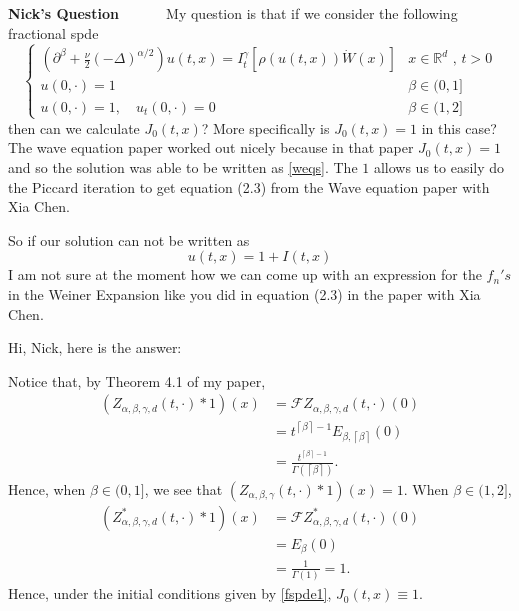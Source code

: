 \documentclass[a4paper,11pt]{article}
\numberwithin{equation}{section}
\theoremstyle{plain}
\theoremstyle{definition}
\newcommand{\Ceil}[1]{\left\lceil #1 \right\rceil}
\newcommand{\calF}{\mathcal{F}}
\newcommand{\R}{\mathbb{R}}
\newcounter{NQ}
\newenvironment{NickQuestion}[1][] %
{\refstepcounter{NQ}
	\begin{mdframed}[backgroundcolor=lightgray]\textbf{Nick's Question \theNQ \: #1~~}~~~\noindent}%
	{\end{mdframed}}
\numberwithin{NQ}{section}
\numberwithin{LQ}{section}
\numberwithin{ZQ}{section}
\begin{document}
\begin{NickQuestion}
		My question is that if we consider the following fractional spde
		\begin{equation}
		\label{fspde1}
		\begin{cases}
		\left(\partial^\beta + \frac{\nu}{2}(-\Delta)^{\alpha/2}\right)u(t,x) = I^\gamma_t \left[\rho(u(t,x))\dot W(x) \right] & \text{$x\in \R^d$ , $t>0$} \\
		u(0,\cdot) = 1                                                                                                         & \beta \in (0,1]            \\
		u(0,\cdot) = 1, \quad u_t(0,\cdot) = 0                                                                                 & \beta \in (1,2]
		\end{cases}
		\end{equation}
		then can we calculate $J_0(t,x)$? More specifically is $J_0(t,x) = 1$ in this
		case? The wave equation paper worked out nicely because in that paper
		$J_0(t,x) =1$ and so the solution was able to be written as \ref{weqs}. The
		$1$ allows us to easily do the Piccard iteration to get equation (2.3) from
		the Wave equation paper with Xia Chen.

		So if our solution can not be written as
		\[
		u(t,x) = 1 + I(t,x)
		\]
		I am not sure at the moment how we can come up with an expression for the $f_n's$ in the Weiner Expansion like you did in equation (2.3) in the paper with Xia Chen.
	\end{NickQuestion}

	Hi, Nick, here is the answer:

	Notice that, by Theorem 4.1 of my paper,
	\begin{align*}
	(Z_{\alpha,\beta,\gamma,d}(t,\cdot)*1)(x) & = \calF Z_{\alpha,\beta,\gamma,d}(t,\cdot)(0)  \\
	& = t^{\Ceil{\beta}-1} E_{\beta,\Ceil{\beta}}(0) \\
	& = \frac{ t^{\Ceil{\beta}-1} }{\Gamma(\Ceil{\beta})}.
	\end{align*}
	Hence, when $\beta\in(0,1]$, we see that $(Z_{\alpha,\beta,\gamma}(t,\cdot)*1)(x)=1$.
	When $\beta\in (1,2]$,
	\begin{align*}
	(Z_{\alpha,\beta,\gamma,d}^*(t,\cdot)*1)(x) & = \calF Z_{\alpha,\beta,\gamma,d}^*(t,\cdot)(0) \\
	& = E_{\beta}(0)                     \\
	& = \frac{1}{\Gamma(1)} = 1.
	\end{align*}
	Hence, under the initial conditions given by \eqref{fspde1}, $J_0(t,x)\equiv 1$.
\end{document}
